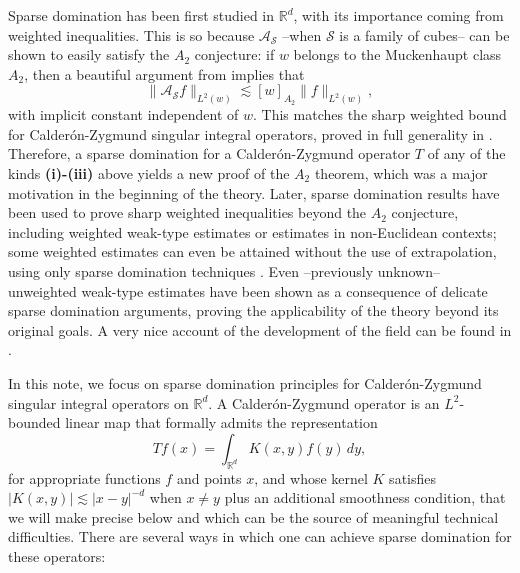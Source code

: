 \documentclass[12pt]{amsart}
\newcommand{\R}{\mathbb{R}}
\newcommand{\Ss}{\mathcal{S}}
\newcommand{\AS}{\mathcal{A}_{\Ss}}
\theoremstyle{plain}
\theoremstyle{definition} %
\numberwithin{equation}{section}
\begin{document}
Sparse domination has been first studied in $\R^d$, with its importance coming from weighted inequalities. This is so because $\AS$ --when $\Ss$ is a family of cubes-- can be shown to easily satisfy the $A_2$ conjecture: if $w$ belongs to the Muckenhaupt class $A_2$, then a beautiful argument from \cite{CMP2012} implies that
$$
\|\AS f\|_{L^2(w)} \lesssim [w]_{A_2} \|f\|_{L^2(w)},
$$
with implicit constant independent of $w$. This matches the sharp weighted bound for Calder\'on-Zygmund singular integral operators, proved in full generality in \cite{Hy2012}. Therefore, a sparse domination for a Calder\'on-Zygmund operator $T$ of any of the kinds \textbf{(i)-(iii)} above yields a new proof of the $A_2$ theorem, which was a major motivation in the beginning of the theory. Later, sparse domination results have been used to prove sharp weighted inequalities beyond the $A_2$ conjecture, including weighted weak-type estimates or estimates in non-Euclidean contexts; some weighted estimates can even be attained without the use of extrapolation, using only sparse domination techniques \cite{Moen}. Even --previously unknown-- unweighted weak-type estimates have been shown as a consequence of delicate sparse domination arguments, proving the applicability of the theory beyond its original goals. A very nice account of the development of the field can be found in \cite{Pe2019}. 

In this note, we focus on sparse domination principles for Calder\'on-Zygmund singular integral operators on $\R^d$. A Calder\'on-Zygmund operator is an $L^2$-bounded linear map that formally admits the representation
$$
Tf(x) = \int_{\R^d} K(x,y) f(y) \, dy,
$$
for appropriate functions $f$ and points $x$, and whose kernel $K$ satisfies $|K(x,y)| \lesssim |x-y|^{-d}$ when $x\neq y$ plus an additional smoothness condition, that we will make precise below and which can be the source of meaningful technical difficulties. There are several ways in which one can achieve sparse domination for these operators:
\end{document}
